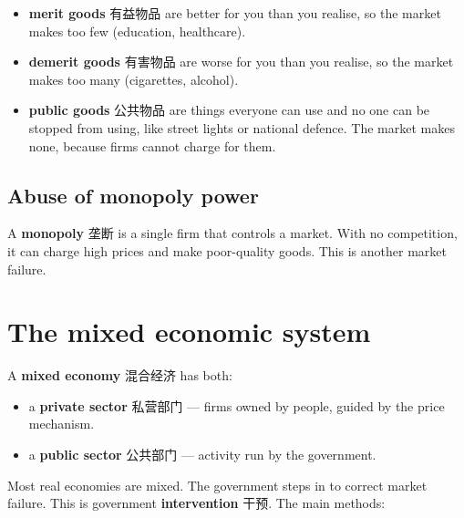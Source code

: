 \documentclass[11pt]{article}
\begin{document}
\begin{itemize}
\item \textbf{merit goods} 有益物品 are better for you than you realise, so the market makes too few (education, healthcare).

\item \textbf{demerit goods} 有害物品 are worse for you than you realise, so the market makes too many (cigarettes, alcohol).

\item \textbf{public goods} 公共物品 are things everyone can use and no one can be stopped from using, like street lights or national defence. The market makes none, because firms cannot charge for them.

\end{itemize}

\subsection*{Abuse of monopoly power}

A \textbf{monopoly} 垄断 is a single firm that controls a market. With no competition, it can charge high prices and make poor-quality goods. This is another market failure.

\section*{The mixed economic system}

A \textbf{mixed economy} 混合经济 has both:

\begin{itemize}
\item a \textbf{private sector} 私营部门 — firms owned by people, guided by the price mechanism.

\item a \textbf{public sector} 公共部门 — activity run by the government.

\end{itemize}

Most real economies are mixed. The government steps in to correct market failure. This is government \textbf{intervention} 干预. The main methods:
\end{document}
